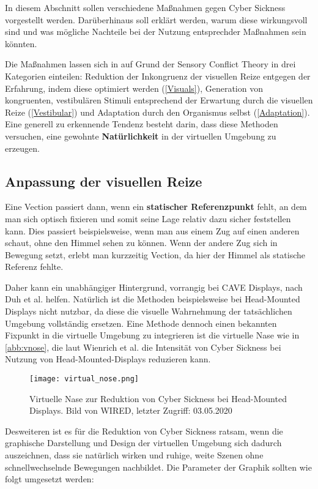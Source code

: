 In diesem Abschnitt sollen verschiedene Ma{\ss}nahmen gegen Cyber Sickness vorgestellt werden. Dar\"uberhinaus soll erkl\"art werden, warum diese wirkungsvoll sind und was m\"ogliche Nachteile bei der Nutzung entsprechder Ma{\ss}nahmen sein k\"onnten.

Die Ma{\ss}nahmen lassen sich in auf Grund der Sensory Conflict Theory in drei Kategorien einteilen:
Reduktion der Inkongruenz der visuellen Reize entgegen der Erfahrung, indem diese optimiert werden (\autoref{Visuals}), Generation von kongruenten, vestibul\"aren Stimuli entsprechend der Erwartung durch die visuellen Reize (\autoref{Vestibular}) und Adaptation durch den Organismus selbst (\autoref{Adaptation}). Eine generell zu erkennende Tendenz besteht darin, dass diese Methoden versuchen, eine gewohnte \textbf{Nat\"urlichkeit} in der virtuellen Umgebung zu erzeugen.

\subsection{Anpassung der visuellen Reize}\label{Visuals}
Eine Vection passiert dann, wenn ein \textbf{statischer Referenzpunkt} fehlt, an dem man sich optisch fixieren und somit seine Lage relativ dazu sicher feststellen kann. Dies passiert beispielsweise, wenn man aus einem Zug auf einen anderen schaut, ohne den Himmel sehen zu k\"onnen. Wenn der andere Zug sich in Bewegung setzt, erlebt man kurzzeitig Vection, da hier der Himmel als statische Referenz fehlte.

Daher kann ein unabh\"angiger Hintergrund, vorrangig bei CAVE Displays, nach Duh et al.\cite{Duh:2001:Static} helfen. Nat\"urlich ist die Methoden beispielsweise bei Head-Mounted Displays nicht nutzbar, da diese die visuelle Wahrnehmung der tats\"achlichen Umgebung vollst\"andig ersetzen. Eine Methode dennoch einen bekannten Fixpunkt in die virtuelle Umgebung zu integrieren ist die virtuelle Nase wie in \autoref{abb:vnose}, die laut Wienrich et al.\cite{Wienrich:2018:Nose} die Intensit\"at von Cyber Sickness bei Nutzung von Head-Mounted-Displays reduzieren kann.


\begin{figure}[b]
	\centering 
	\texttt{[image: virtual\_nose.png]}
	\caption{Virtuelle Nase zur Reduktion von Cyber Sickness bei Head-Mounted Displays. Bild von WIRED\cite{WIRED:2020:Nose}, letzter Zugriff: 03.05.2020}
	\label{abb:vnose}
\end{figure}


Desweiteren ist es f\"ur die Reduktion von Cyber Sickness ratsam, wenn die graphische Darstellung und Design der virtuellen Umgebung sich dadurch auszeichnen, dass sie nat\"urlich wirken und ruhige, weite Szenen ohne schnellwechselnde Bewegungen nachbildet. Die Parameter der Graphik sollten wie folgt umgesetzt werden:


